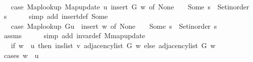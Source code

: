 \begin{isabellebody}
\ \ \isamarkupfalse%
\ \isamarkupfalse%
\ {\isachardoublequoteopen}{\isachardot}{\kern0pt}{\isachardot}{\kern0pt}{\isachardot}{\kern0pt}\ {\isacharequal}{\kern0pt}\ {\isacharparenleft}{\kern0pt}case\ Map{\isacharunderscore}{\kern0pt}lookup\ {\isacharparenleft}{\kern0pt}Map{\isacharunderscore}{\kern0pt}update\ {\isacharquery}{\kern0pt}u\ {\isacharquery}{\kern0pt}insert\ G{\isacharparenright}{\kern0pt}\ w\ of\ None\ {\isasymRightarrow}\ {\isacharbrackleft}{\kern0pt}{\isacharbrackright}{\kern0pt}\ {\isacharbar}{\kern0pt}\ Some\ s\ {\isasymRightarrow}\ Set{\isacharunderscore}{\kern0pt}inorder\ s{\isacharparenright}{\kern0pt}{\isachardoublequoteclose}\isanewline
\ \ \ \ \isamarkupfalse%
\ {\isacharparenleft}{\kern0pt}simp\ add{\isacharcolon}{\kern0pt}\ insert{\isacharunderscore}{\kern0pt}def\ Some{\isacharparenright}{\kern0pt}\isanewline
\ \ \isamarkupfalse%
\ \isamarkupfalse%
\ {\isachardoublequoteopen}{\isachardot}{\kern0pt}{\isachardot}{\kern0pt}{\isachardot}{\kern0pt}\ {\isacharequal}{\kern0pt}\ {\isacharparenleft}{\kern0pt}case\ {\isacharparenleft}{\kern0pt}Map{\isacharunderscore}{\kern0pt}lookup\ G{\isacharparenleft}{\kern0pt}{\isacharquery}{\kern0pt}u\ {\isasymmapsto}\ {\isacharquery}{\kern0pt}insert{\isacharparenright}{\kern0pt}{\isacharparenright}{\kern0pt}\ w\ of\ None\ {\isasymRightarrow}\ {\isacharbrackleft}{\kern0pt}{\isacharbrackright}{\kern0pt}\ {\isacharbar}{\kern0pt}\ Some\ s\ {\isasymRightarrow}\ Set{\isacharunderscore}{\kern0pt}inorder\ s{\isacharparenright}{\kern0pt}{\isachardoublequoteclose}\isanewline
\ \ \ \ \isamarkupfalse%
\ assms\isanewline
\ \ \ \ \isamarkupfalse%
\ {\isacharparenleft}{\kern0pt}simp\ add{\isacharcolon}{\kern0pt}\ invar{\isacharunderscore}{\kern0pt}def\ M{\isachardot}{\kern0pt}map{\isacharunderscore}{\kern0pt}update{\isacharparenright}{\kern0pt}\isanewline
\ \ \isamarkupfalse%
\ \isamarkupfalse%
\ {\isachardoublequoteopen}{\isachardot}{\kern0pt}{\isachardot}{\kern0pt}{\isachardot}{\kern0pt}\ {\isacharequal}{\kern0pt}\ {\isacharparenleft}{\kern0pt}if\ w\ {\isacharequal}{\kern0pt}\ {\isacharquery}{\kern0pt}u\ then\ ins{\isacharunderscore}{\kern0pt}list\ {\isacharquery}{\kern0pt}v\ {\isacharparenleft}{\kern0pt}adjacency{\isacharunderscore}{\kern0pt}list\ G\ w{\isacharparenright}{\kern0pt}\ else\ adjacency{\isacharunderscore}{\kern0pt}list\ G\ w{\isacharparenright}{\kern0pt}{\isachardoublequoteclose}\isanewline
\ \ \isamarkupfalse%
\ {\isacharparenleft}{\kern0pt}cases\ {\isachardoublequoteopen}w\ {\isacharequal}{\kern0pt}\ {\isacharquery}{\kern0pt}u{\isachardoublequoteclose}{\isacharparenright}{\kern0pt}\isanewline

\end{isabellebody}
